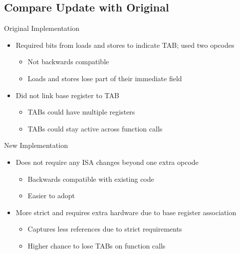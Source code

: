 \documentclass{beamer}
\begin{document}
\subsection{Compare Update with Original}
\begin{frame}{Original Implementation}
      \begin{itemize}
         \item Required bits from loads and stores to indicate TAB; used two opcodes
            \begin{itemize}
               \item Not backwards compatible
               \item Loads and stores lose part of their immediate field
            \end{itemize}
         \item Did not link base register to TAB
            \begin{itemize}
               \item TABs could have multiple registers
               \item TABs could stay active across function calls
            \end{itemize}
      \end{itemize}
   \end{frame}
      \begin{frame}{New Implementation}
      \begin{itemize}
         \item Does not require any ISA changes beyond one extra opcode
            \begin{itemize}
               \item Backwards compatible with existing code
               \item Easier to adopt
            \end{itemize}
         \item More strict and requires extra hardware due to base register association
            \begin{itemize}
               \item Captures less references due to strict requirements
               \item Higher chance to lose TABs on function calls
            \end{itemize}
      \end{itemize}
\end{frame}
\end{document}
